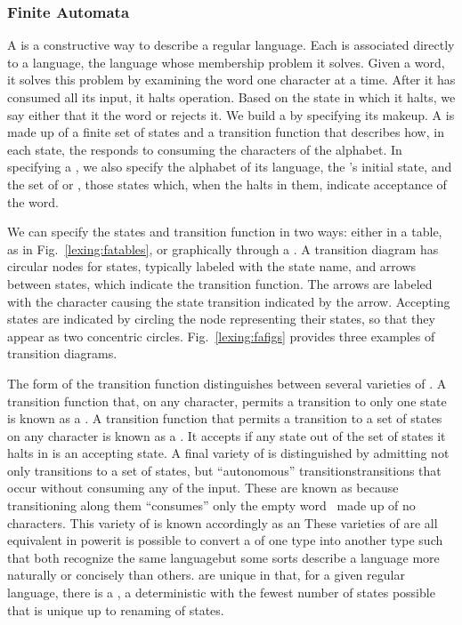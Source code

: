 \subsubsection{Finite Automata}
A \FA is a constructive way to describe a regular language. Each \FA is associated directly to a language, the language whose membership problem it solves. Given a word, it solves this problem by examining the word one character at a time. After it has consumed all its input, it halts operation. Based on the state in which it halts, we say either that it  the word or rejects it. We build a \FA by specifying its makeup. A \FA is made up of a finite set of states and a transition function that describes how, in each state, the \FA responds to consuming the characters of the alphabet. In specifying a \FA{}, we also specify the alphabet of its language, the \FA's initial state, and the set of  or , those states which, when the \FA halts in them, indicate acceptance of the word.

We can specify the states and transition function in two ways: either in a table, as in Fig.~\ref{lexing:fatables}, or graphically through a . A transition diagram has circular nodes for states, typically labeled with the state name, and arrows between states, which indicate the transition function. The arrows are labeled with the character causing the state transition indicated by the arrow. Accepting states are indicated by circling the node representing their states, so that they appear as two concentric circles. Fig.~\ref{lexing:fafigs} provides three examples of transition diagrams.





The form of the transition function distinguishes between several varieties of \FAs. A transition function that, on any character, permits a transition to only one state is known as a . A transition function that permits a transition to a set of states on any character is known as a . It accepts if any state out of the set of states it halts in is an accepting state. A final variety of \FA is distinguished by admitting not only transitions to a set of states, but ``autonomous'' transitions\empause transitions that occur without consuming any of the input. These are known as  because transitioning along them ``consumes'' only the empty word \emptyword\ made up of no characters. This variety of \FA is known accordingly as an These varieties of \FAs are all equivalent in power\empause it is possible to convert a \FA of one type into another type such that both recognize the same language\empause but some sorts describe a language more naturally or concisely than others. \FAs[F] are unique in that, for a given regular language, there is a , a deterministic \FA with the fewest number of states possible that is unique up to renaming of states.

